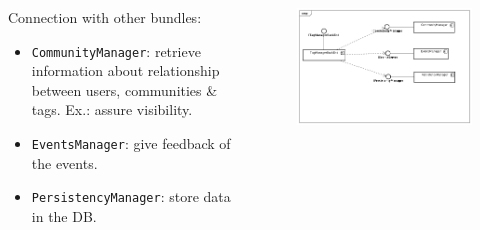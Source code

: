 \begin{frame}


\begin{columns}

	\begin{column}{6cm}
	Connection with other bundles:
	
	\begin{itemize}
	  \item \texttt{CommunityManager}: retrieve information about relationship
	  between users, communities \& tags. Ex.: assure visibility.
	  \item \texttt{EventsManager}: give feedback of the events.
	  \item \texttt{PersistencyManager}: store data in the DB.
	\end{itemize}
		
	
	\end{column}
	
		\begin{column}{7cm}
	    
			\begin{figure}
			 	\includegraphics[scale=0.21]{img/TagManagerBackEndComponentsDiagram.png}
			\end{figure}
	    
	    \end{column}
	
\end{columns}

\end{frame}

